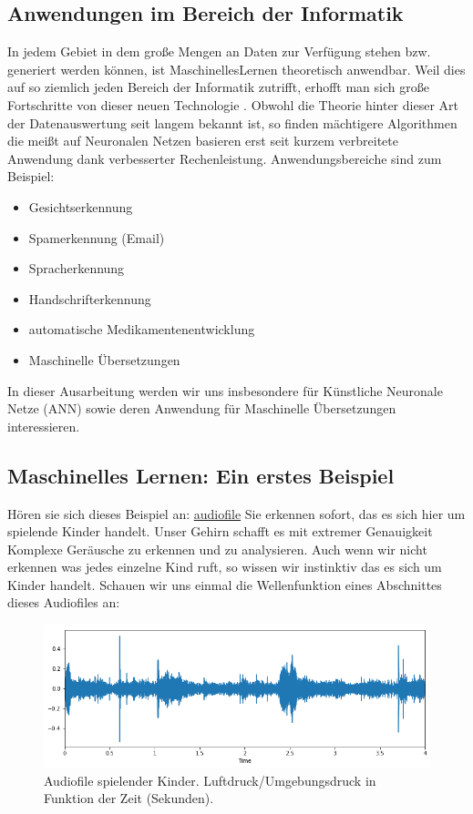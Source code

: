 \documentclass{thesisclass}
\begin{document}
\subsection{Anwendungen im Bereich der Informatik}
	In jedem Gebiet in dem große Mengen an Daten zur Verf\"ugung stehen bzw. generiert werden können, ist \gls{MaschinellesLernen} theoretisch anwendbar. Weil dies auf so ziemlich jeden Bereich der Informatik zutrifft, erhofft man sich große Fortschritte von dieser neuen Technologie \cite{kour_2018}. \newline
Obwohl die Theorie hinter dieser Art der Datenauswertung seit langem bekannt ist, so finden m\"achtigere Algorithmen die meißt auf Neuronalen Netzen basieren erst seit kurzem verbreitete Anwendung dank verbesserter Rechenleistung. \cite{DBLP:journals/corr/abs-1803-08971} \newline
	\newline Anwendungsbereiche sind zum Beispiel:
\begin{itemize}
	\item Gesichtserkennung
	\item Spamerkennung (Email)
	\item Spracherkennung
	\item Handschrifterkennung
	\item automatische Medikamentenentwicklung
	\item Maschinelle Übersetzungen
\end{itemize}

In dieser Ausarbeitung werden wir uns insbesondere für Künstliche Neuronale Netze (\gls{ANN}) sowie deren Anwendung für Maschinelle Übersetzungen interessieren.

\subsection{Maschinelles Lernen: Ein erstes Beispiel}
	Hören sie sich dieses Beispiel an: \hyperlink{https://www.audioblocks.com/stock-audio/playground-children-playing.html}{audiofile}\newline
	Sie erkennen sofort, das es sich hier um spielende Kinder handelt.
Unser Gehirn schafft es mit extremer Genauigkeit Komplexe Geräusche zu erkennen und zu analysieren. Auch wenn wir nicht erkennen was jedes einzelne Kind ruft, so wissen wir instinktiv das es sich um Kinder handelt.
Schauen wir uns einmal die Wellenfunktion eines Abschnittes dieses Audiofiles an:
\begin{figure}[h!]
\includegraphics[width=\textwidth]{images/KidsPlaying.png}
  \caption{Audiofile spielender Kinder. Luftdruck/Umgebungsdruck in Funktion der Zeit (Sekunden). \cite{shaikh_faizan_2017}}
  \label{fig:Audiofile Spielende Kinder}
\end{figure}
\end{document}
